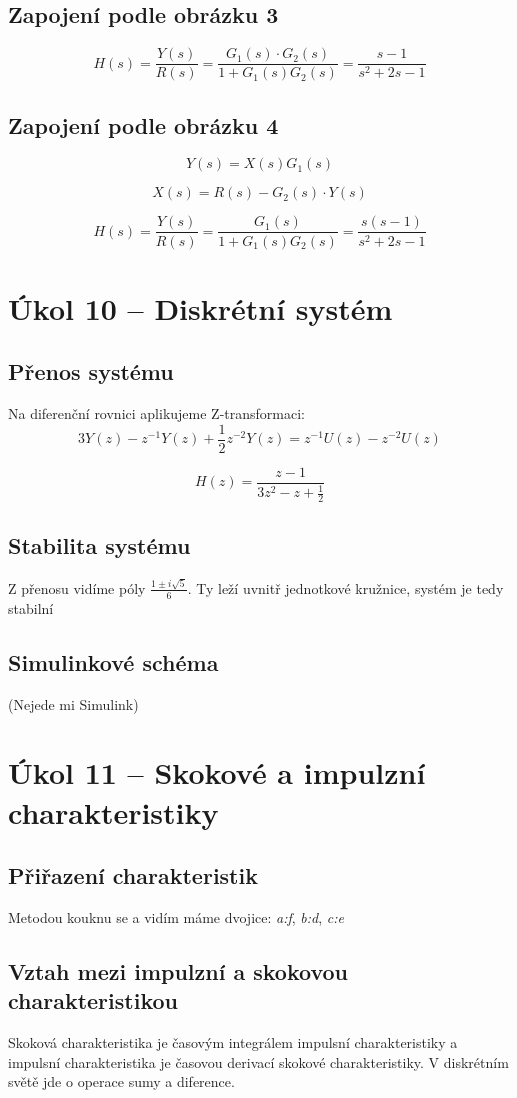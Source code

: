 \documentclass[a4paper,12pt]{article}
\begin{document}
\subsection{Zapojení podle obrázku 3}
$$
H(s) = \frac{Y(s)}{R(s)} = \frac{G_1(s)\cdot G_2(s)}{1+G_1(s) G_2(s)} = \frac{s-1}{s^2 + 2s -1}
$$

\subsection{Zapojení podle obrázku 4}
$$
Y(s) = X(s) G_1(s)
$$

$$
X(s) = R(s)-G_2(s)\cdot Y(s)
$$

$$
H(s) = \frac{Y(s)}{R(s)} = \frac{G_1(s)}{1+G_1(s) G_2(s)} = \frac{s(s-1)}{s^2 + 2s -1}
$$

\section{Úkol 10 -- Diskrétní systém}
\subsection{Přenos systému}
Na diferenční rovnici aplikujeme Z-transformaci:
$$
3Y(z) - z^{-1} Y(z) + \frac{1}{2}z^{-2} Y(z) = z^{-1} U(z) - z^{-2} U(z)
$$

$$
H(z) = \frac{z-1}{3z^2-z+\frac{1}{2}}
$$

\subsection{Stabilita systému}
Z přenosu vidíme póly $\frac{1\pm i\sqrt{5}}{6}$. Ty leží uvnitř jednotkové kružnice, systém je tedy stabilní

\subsection{Simulinkové schéma}
(Nejede mi Simulink)

\section{Úkol 11 -- Skokové a impulzní charakteristiky}
\subsection{Přiřazení charakteristik}
Metodou kouknu se a vidím máme dvojice: \textit{a:f},  \textit{b:d}, \textit{c:e}

\subsection{Vztah mezi impulzní a skokovou charakteristikou}
Skoková charakteristika je časovým integrálem impulsní charakteristiky a impulsní charakteristika je časovou derivací skokové charakteristiky. V diskrétním světě jde o operace sumy a diference.
\end{document}
